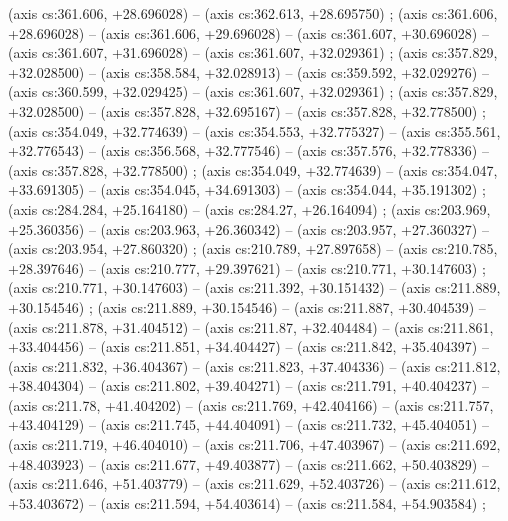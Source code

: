     (axis cs:361.606,    +28.696028) --  (axis cs:362.613,    +28.695750) ;
    (axis cs:361.606,    +28.696028) --  (axis cs:361.606,    +29.696028) --  (axis cs:361.607,    +30.696028) --  (axis cs:361.607,    +31.696028) --  (axis cs:361.607,    +32.029361) ;
    (axis cs:357.829,    +32.028500) --  (axis cs:358.584,    +32.028913) --  (axis cs:359.592,    +32.029276) --  (axis cs:360.599,    +32.029425) --  (axis cs:361.607,    +32.029361) ;
    (axis cs:357.829,    +32.028500) --  (axis cs:357.828,    +32.695167) --  (axis cs:357.828,    +32.778500) ;
    (axis cs:354.049,    +32.774639) --  (axis cs:354.553,    +32.775327) --  (axis cs:355.561,    +32.776543) --  (axis cs:356.568,    +32.777546) --  (axis cs:357.576,    +32.778336) --  (axis cs:357.828,    +32.778500) ;
    (axis cs:354.049,    +32.774639) --  (axis cs:354.047,    +33.691305) --  (axis cs:354.045,    +34.691303) --  (axis cs:354.044,    +35.191302) ;
    (axis cs:284.284,    +25.164180) --  (axis cs:284.27,    +26.164094) ;
    (axis cs:203.969,    +25.360356) --  (axis cs:203.963,    +26.360342) --  (axis cs:203.957,    +27.360327) --  (axis cs:203.954,    +27.860320) ;
    (axis cs:210.789,    +27.897658) --  (axis cs:210.785,    +28.397646) --  (axis cs:210.777,    +29.397621) --  (axis cs:210.771,    +30.147603) ;
    (axis cs:210.771,    +30.147603) --  (axis cs:211.392,    +30.151432) --  (axis cs:211.889,    +30.154546) ;
    (axis cs:211.889,    +30.154546) --  (axis cs:211.887,    +30.404539) --  (axis cs:211.878,    +31.404512) --  (axis cs:211.87,    +32.404484) --  (axis cs:211.861,    +33.404456) --  (axis cs:211.851,    +34.404427) --  (axis cs:211.842,    +35.404397) --  (axis cs:211.832,    +36.404367) --  (axis cs:211.823,    +37.404336) --  (axis cs:211.812,    +38.404304) --  (axis cs:211.802,    +39.404271) --  (axis cs:211.791,    +40.404237) --  (axis cs:211.78,    +41.404202) --  (axis cs:211.769,    +42.404166) --  (axis cs:211.757,    +43.404129) --  (axis cs:211.745,    +44.404091) --  (axis cs:211.732,    +45.404051) --  (axis cs:211.719,    +46.404010) --  (axis cs:211.706,    +47.403967) --  (axis cs:211.692,    +48.403923) --  (axis cs:211.677,    +49.403877) --  (axis cs:211.662,    +50.403829) --  (axis cs:211.646,    +51.403779) --  (axis cs:211.629,    +52.403726) --  (axis cs:211.612,    +53.403672) --  (axis cs:211.594,    +54.403614) --  (axis cs:211.584,    +54.903584) ;
